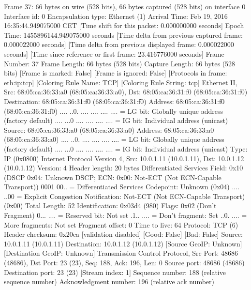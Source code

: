 Frame 37: 66 bytes on wire (528 bits), 66 bytes captured (528 bits) on interface 0
    Interface id: 0
    Encapsulation type: Ethernet (1)
    Arrival Time: Feb 19, 2016 16:35:44.949075000 CET
    [Time shift for this packet: 0.000000000 seconds]
    Epoch Time: 1455896144.949075000 seconds
    [Time delta from previous captured frame: 0.000022000 seconds]
    [Time delta from previous displayed frame: 0.000022000 seconds]
    [Time since reference or first frame: 23.416776000 seconds]
    Frame Number: 37
    Frame Length: 66 bytes (528 bits)
    Capture Length: 66 bytes (528 bits)
    [Frame is marked: False]
    [Frame is ignored: False]
    [Protocols in frame: eth:ip:tcp]
    [Coloring Rule Name: TCP]
    [Coloring Rule String: tcp]
Ethernet II, Src: 68:05:ca:36:33:a0 (68:05:ca:36:33:a0), Dst: 68:05:ca:36:31:f0 (68:05:ca:36:31:f0)
    Destination: 68:05:ca:36:31:f0 (68:05:ca:36:31:f0)
        Address: 68:05:ca:36:31:f0 (68:05:ca:36:31:f0)
        .... ..0. .... .... .... .... = LG bit: Globally unique address (factory default)
        .... ...0 .... .... .... .... = IG bit: Individual address (unicast)
    Source: 68:05:ca:36:33:a0 (68:05:ca:36:33:a0)
        Address: 68:05:ca:36:33:a0 (68:05:ca:36:33:a0)
        .... ..0. .... .... .... .... = LG bit: Globally unique address (factory default)
        .... ...0 .... .... .... .... = IG bit: Individual address (unicast)
    Type: IP (0x0800)
Internet Protocol Version 4, Src: 10.0.1.11 (10.0.1.11), Dst: 10.0.1.12 (10.0.1.12)
    Version: 4
    Header length: 20 bytes
    Differentiated Services Field: 0x10 (DSCP 0x04: Unknown DSCP; ECN: 0x00: Not-ECT (Not ECN-Capable Transport))
        0001 00.. = Differentiated Services Codepoint: Unknown (0x04)
        .... ..00 = Explicit Congestion Notification: Not-ECT (Not ECN-Capable Transport) (0x00)
    Total Length: 52
    Identification: 0x03d4 (980)
    Flags: 0x02 (Don't Fragment)
        0... .... = Reserved bit: Not set
        .1.. .... = Don't fragment: Set
        ..0. .... = More fragments: Not set
    Fragment offset: 0
    Time to live: 64
    Protocol: TCP (6)
    Header checksum: 0x20ca [validation disabled]
        [Good: False]
        [Bad: False]
    Source: 10.0.1.11 (10.0.1.11)
    Destination: 10.0.1.12 (10.0.1.12)
    [Source GeoIP: Unknown]
    [Destination GeoIP: Unknown]
Transmission Control Protocol, Src Port: 48686 (48686), Dst Port: 23 (23), Seq: 188, Ack: 196, Len: 0
    Source port: 48686 (48686)
    Destination port: 23 (23)
    [Stream index: 1]
    Sequence number: 188    (relative sequence number)
    Acknowledgment number: 196    (relative ack number)
